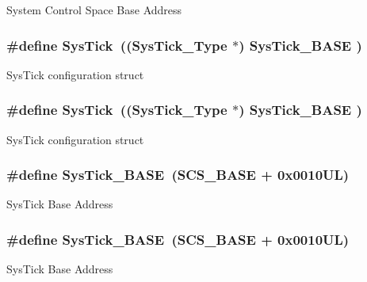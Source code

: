 System Control Space Base Address \hypertarget{group___c_m_s_i_s__core__register_gacd96c53beeaff8f603fcda425eb295de}{
\subsubsection[{Sys\-Tick}]{\setlength{\rightskip}{0pt plus 5cm}\#define Sys\-Tick~(({\bf Sys\-Tick\-\_\-\-Type}   $\ast$)     {\bf Sys\-Tick\-\_\-\-B\-A\-S\-E}  )}}\label{group___c_m_s_i_s__core__register_gacd96c53beeaff8f603fcda425eb295de}
Sys\-Tick configuration struct \hypertarget{group___c_m_s_i_s__core__register_gacd96c53beeaff8f603fcda425eb295de}{
\subsubsection[{Sys\-Tick}]{\setlength{\rightskip}{0pt plus 5cm}\#define Sys\-Tick~(({\bf Sys\-Tick\-\_\-\-Type}   $\ast$)     {\bf Sys\-Tick\-\_\-\-B\-A\-S\-E}  )}}\label{group___c_m_s_i_s__core__register_gacd96c53beeaff8f603fcda425eb295de}
Sys\-Tick configuration struct \hypertarget{group___c_m_s_i_s__core__register_ga58effaac0b93006b756d33209e814646}{
\subsubsection[{Sys\-Tick\-\_\-\-B\-A\-S\-E}]{\setlength{\rightskip}{0pt plus 5cm}\#define Sys\-Tick\-\_\-\-B\-A\-S\-E~({\bf S\-C\-S\-\_\-\-B\-A\-S\-E} +  0x0010\-U\-L)}}\label{group___c_m_s_i_s__core__register_ga58effaac0b93006b756d33209e814646}
Sys\-Tick Base Address \hypertarget{group___c_m_s_i_s__core__register_ga58effaac0b93006b756d33209e814646}{
\subsubsection[{Sys\-Tick\-\_\-\-B\-A\-S\-E}]{\setlength{\rightskip}{0pt plus 5cm}\#define Sys\-Tick\-\_\-\-B\-A\-S\-E~({\bf S\-C\-S\-\_\-\-B\-A\-S\-E} +  0x0010\-U\-L)}}\label{group___c_m_s_i_s__core__register_ga58effaac0b93006b756d33209e814646}
Sys\-Tick Base Address 
